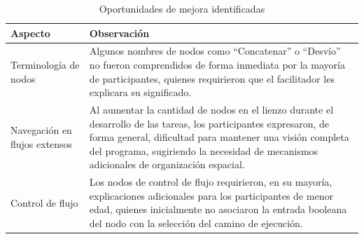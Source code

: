\begin{table}[H]
    \caption{Oportunidades de mejora identificadas}
    \label{tab:observaciones-negativas}
    \begingroup
    \renewcommand{\TableBodyFontSize}{\footnotesize}
    \begin{tabularx}{\textwidth}{ l X }
        \hline
        \textbf{Aspecto}              & \textbf{Observación}                                                                                                                                                                                                                                                      \\
        \hline
        Terminología de nodos         & Algunos nombres de nodos como ``Concatenar'' o ``Desvío'' no fueron comprendidos de forma inmediata por la mayoría de participantes, quienes requirieron que el facilitador les explicara su significado.                                                                 \\
        Navegación en flujos extensos & Al aumentar la cantidad de nodos en el lienzo durante el desarrollo de las tareas, los participantes expresaron, de forma general, dificultad para mantener una visión completa del programa, sugiriendo la necesidad de mecanismos adicionales de organización espacial. \\
        Control de flujo              & Los nodos de control de flujo requirieron, en su mayoría, explicaciones adicionales para los participantes de menor edad, quienes inicialmente no asociaron la entrada booleana del nodo con la selección del camino de ejecución.                                        \\
        \hline
    \end{tabularx}
    \endgroup
\end{table}

